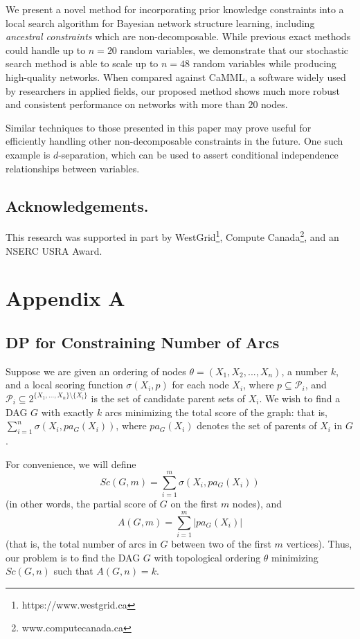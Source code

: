 \documentclass[twoside,11pt]{article}
\begin{document}
We present a novel method for incorporating prior knowledge constraints into a local search algorithm for Bayesian network structure learning, including \emph{ancestral
constraints} which are non-decomposable. While previous exact methods could handle up to $n = 20$ random variables, we demonstrate that our stochastic search method
is able to scale up to $n = 48$ random variables while producing high-quality networks. When compared against CaMML, a software widely used by researchers in applied
fields, our proposed method shows much more robust and consistent performance on networks with more than $20$ nodes. 

\medskip
Similar techniques to those presented in this paper may prove useful for efficiently handling other non-decomposable constraints in the future. One such example 
is $d$-separation, which can be used to assert conditional independence relationships between variables.


\subsection{Acknowledgements.}

	This research was supported in part by WestGrid\footnote{https://www.westgrid.ca}, Compute Canada\footnote{www.computecanada.ca},
and an NSERC USRA Award. 




\section{Appendix A}
\subsection{DP for Constraining Number of Arcs}

Suppose we are given an ordering of nodes $\theta = (X_1, X_2, ..., X_n)$, a number $k$, and a local scoring function $\sigma(X_i, p)$ for each node $X_i$, where $p \subseteq \mathcal{P}_i$, and $\mathcal{P}_i \subseteq 2^{\{ X_1, ..., X_n \} \setminus \{X_i\}}$ is the set of candidate parent sets of $X_i$. We wish to find a DAG $G$ with exactly $k$ arcs minimizing the total score of the graph: that is, $\sum_{i=1}^{n}{ \sigma(X_i, pa_G(X_i)) }$, where $pa_G(X_i)$ denotes the set of parents of $X_i$ in $G$.

\bigskip{}
For convenience, we will define $$Sc(G, m) = \sum_{i=1}^{m}{ \sigma(X_i, pa_G(X_i)) }$$ (in other words, the partial score of $G$ on the first $m$ nodes), and $$A(G, m) = \sum_{i=1}^{m}{|pa_G(X_i)|}$$ (that is, the total number of arcs in $G$ between two of the first $m$ vertices). Thus, our problem is to find the DAG $G$ with topological ordering $\theta$ minimizing $Sc(G,n)$ such that $A(G, n) = k$. 
\end{document}
